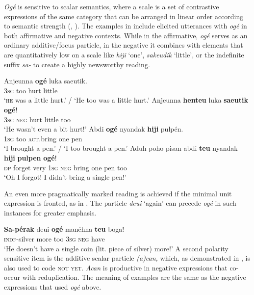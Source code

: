 \documentclass[output=paper]{langscibook}
\begin{document}
\textit{Ogé} is sensitive to scalar semantics, where a scale is a set of contrastive expressions of the same category that can be arranged in linear order according to semantic strength (\citealt{Horn1972}, \citealt{Gazdar1979}). The examples in  include elicited utterances with \textit{ogé} in both affirmative and negative contexts. While in the affirmative, \textit{ogé} serves as an ordinary additive/focus particle, in the negative it combines with elements that are quantitatively low on a scale like \textit{hiji} ‘one’, \textit{sakeudik} ‘little’, or the indefinite suffix \textit{sa-} to create a highly newsworthy reading. 

\ea\label{ex:sun:51}
    \ea\label{ex:sun:51a}
        \gll  Anjeunna \textbf{ogé} luka saeutik. \\ 
              3\textsc{sg} too hurt little \\
        \glt ‘\textsc{he} was a little hurt.’ / ‘He too was a little hurt.’
    \ex\label{ex:sun:51b}
        \gll  Anjeunna \textbf{henteu} luka \textbf{saeutik} \textbf{ogé}!\\
              3\textsc{sg} \textsc{neg} hurt little too\\
        \glt ‘He wasn’t even a bit hurt!’
    \ex\label{ex:sun:51c}
        \gll  Abdi \textbf{ogé} nyandak \textbf{hiji} pulpén. \\
             1\textsc{sg} too \textsc{act}.bring one pen  \\
        \glt ‘I brought a pen.’ / ‘I too brought a pen.’
    \ex\label{ex:sun:51d}
        \gll  Aduh poho pisan abdi \textbf{teu} nyandak \textbf{hiji} \textbf{pulpen} \textbf{ogé}!\\
              \textsc{dp} forget very 1\textsc{sg} \textsc{neg} bring one pen too\\
        \glt ‘Oh I forgot! I didn’t bring a single pen!’ \citep[184]{Butters2021}
    \z
\z  


 An even more pragmatically marked reading is achieved if the minimal unit expression is fronted, as in . The particle \textit{deui} ‘again’ can precede \textit{ogé} in such instances for greater emphasis. 

\ea\label{ex:sun:52} 
    \gll  \textbf{Sa-pérak} deui \textbf{ogé} manéhna \textbf{teu} boga!\\ 
          \textsc{indf}{}-silver more too 3\textsc{sg} \textsc{neg} have\\
    \glt ‘He doesn’t have a single coin (lit. piece of silver) more!’ \citep[184]{Butters2021}
\z 
A second polarity sensitive item is the additive scalar particle \textit{(a)can,} which, as demonstrated in , is also used to code \textsc{not} \textsc{yet}. \textit{Acan} is productive in negative expressions that co-occur with reduplication. The meaning of examples  are the same as the negative expressions that used \textit{ogé} above. 
\end{document}
